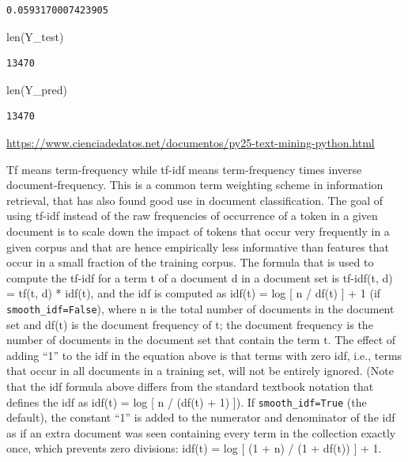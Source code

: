 \documentclass[
  11pt,
  a4paper,
]{article}
\newenvironment{Shaded}{\begin{snugshade}}{\end{snugshade}}
\newcommand{\BuiltInTok}[1]{#1}
\newcommand{\NormalTok}[1]{#1}
\begin{document}
\begin{verbatim}
0.0593170007423905
\end{verbatim}

\begin{Shaded}
\begin{Highlighting}[]
\BuiltInTok{len}\NormalTok{(Y\_test)}
\end{Highlighting}
\end{Shaded}

\begin{verbatim}
13470
\end{verbatim}

\begin{Shaded}
\begin{Highlighting}[]
\BuiltInTok{len}\NormalTok{(Y\_pred)}
\end{Highlighting}
\end{Shaded}

\begin{verbatim}
13470
\end{verbatim}

\url{https://www.cienciadedatos.net/documentos/py25-text-mining-python.html}

Tf means term-frequency while tf-idf means term-frequency times inverse
document-frequency. This is a common term weighting scheme in
information retrieval, that has also found good use in document
classification. The goal of using tf-idf instead of the raw frequencies
of occurrence of a token in a given document is to scale down the impact
of tokens that occur very frequently in a given corpus and that are
hence empirically less informative than features that occur in a small
fraction of the training corpus. The formula that is used to compute the
tf-idf for a term t of a document d in a document set is tf-idf(t, d) =
tf(t, d) * idf(t), and the idf is computed as idf(t) = log {[} n / df(t)
{]} + 1 (if \texttt{smooth\_idf=False}), where n is the total number of
documents in the document set and df(t) is the document frequency of t;
the document frequency is the number of documents in the document set
that contain the term t. The effect of adding ``1'' to the idf in the
equation above is that terms with zero idf, i.e., terms that occur in
all documents in a training set, will not be entirely ignored. (Note
that the idf formula above differs from the standard textbook notation
that defines the idf as idf(t) = log {[} n / (df(t) + 1) {]}). If
\texttt{smooth\_idf=True} (the default), the constant ``1'' is added to
the numerator and denominator of the idf as if an extra document was
seen containing every term in the collection exactly once, which
prevents zero divisions: idf(t) = log {[} (1 + n) / (1 + df(t)) {]} + 1.
\end{document}
